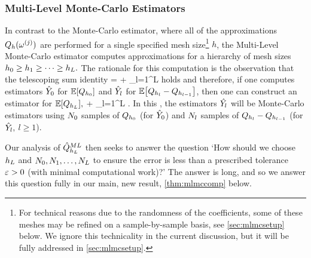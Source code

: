\subsubsection{Multi-Level Monte-Carlo Estimators}

In contrast to the Monte-Carlo estimator, where all of the approximations $Q_{h}(\omega^{(j)})$ are performed for a single specified mesh size\footnote{For technical reasons due to the randomness of the coefficients, some of these meshes may be refined on a sample-by-sample basis, see \cref{sec:mlmcsetup} below. We ignore this technicality in the current discussion, but it will be fully addressed in \cref{sec:mlmcsetup}.} $h$, the Multi-Level Monte-Carlo estimator computes approximations for a hierarchy of mesh sizes $h_{0} \geq h_{1} \geq \cdots \geq h_{L}.$ The rationale for this computation is the observation that the telescoping sum identity
\beq\label{eq:mlmctelescope}
\EXP{\QhL} = \EXP{\Qhz} + \sum_{l=1}^L \EXP{\Qhl-\Qhlmo}
\eeq
holds and therefore, if one computes estimators $\hat{Y}_{0}$ for $\EXP{\Qhz}$ and $\hat{Y}_{l}$ for $\EXP{\Qhl - \Qhlmo}$, then one can construct an estimator for $\EXP{\QhL},$ 
\beqs
\QhatMLhL \de \Yzhat + \sum_{l=1}^L \Ylhat.
\eeqs
In this , the estimators $\hat{Y_{l}}$ will be Monte-Carlo estimators using $N_{0}$ samples of $Q_{h_{0}}$ (for $\hat{Y}_{0}$) and $N_{l}$ samples of $Q_{h_{l}}-Q_{h_{l-1}}$ (for $\hat{Y}_{l},$ $l \geq 1$).

Our analysis of $\hat{Q}^{ML}_{h_{L}}$ then seeks to answer the question `How should we choose $h_{L}$ and $N_{0},N_{1},\ldots,N_{L}$ to ensure the error is less than a prescribed tolerance $\varepsilon>0$ (with minimal computational work)?' The answer is long, and so we answer this question fully in our main, new result, \cref{thm:mlmccomp} below.

